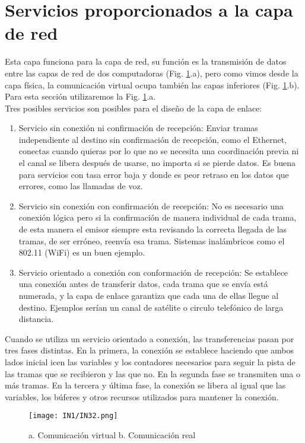 \documentclass[
	12pt, %
	fleqn, %
	a4paper, %
	oneside, %
]{LegrandOrangeBook}
\begin{document}
\section{Servicios proporcionados a la capa de red}
Esta capa funciona para la capa de red, su función es la transmisión de datos entre las capas de red de dos computadoras (Fig. \ref{fig: comuncacion virtual}.a), pero como vimos desde la capa física, la comunicación virtual ocupa también las capas inferiores (Fig. \ref{fig: comuncacion virtual}.b). Para esta sección utilizaremos la Fig. \ref{fig: comuncacion virtual}.a.\\
Tres posibles servicios son posibles para el diseño de la capa de enlace:
\begin{enumerate}
\item Servicio sin conexión ni confirmación de recepción: Enviar tramas independiente al destino sin confirmación de recepción, como el Ethernet, conectas cuando quieras por lo que no se necesita una coordinación previa ni el canal se libera después de usarse, no importa si se pierde datos. Es buena para servicios con tasa error baja y donde es peor retraso en los datos que errores, como las llamadas de voz.
\item Servicio sin conexión con confirmación de recepción: No es necesario una conexión lógica pero si la confirmación de manera individual de cada trama, de esta manera el emisor siempre esta revisando la correcta llegada de las tramas, de ser erróneo, reenvía esa trama. Sistemas inalámbricos como el 802.11 (WiFi) es un buen ejemplo.
\item Servicio orientado a conexión con conformación de recepción: Se establece una conexión antes de transferir datos, cada trama que se envía está numerada, y la capa de enlace garantiza que cada una de ellas llegue al destino. Ejemplos serían un canal de satélite o circulo telefónico de larga distancia.
\end{enumerate}
Cuando se utiliza un servicio orientado a conexión, las transferencias pasan por tres fases distintas. En la primera, la conexión se establece haciendo que ambos lados inicial icen las variables y los contadores necesarios para seguir la pista de las tramas que se recibieron y las que no. En la segunda fase se transmiten una o más tramas. En la tercera y última fase, la conexión se libera al igual que las variables, los búferes y otros recursos utilizados para mantener la conexión.
\begin{figure}[]
\centering
\texttt{[image: IN1/IN32.png]}
\caption{a. Comunicación virtual b. Comunicación real}
\label{fig: comuncacion virtual}
\end{figure}
\end{document}

